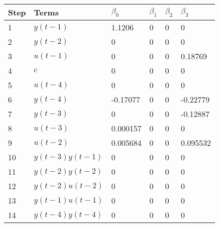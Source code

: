 \begin{tabular}{llllll}
Step & Terms & $\beta_{0}$ & $\beta_{1}$ & $\beta_{2}$ & $\beta_{3}$ \\ 
\hline 
1 & $y(t-1)$ & 1.1206 & 0 & 0 & 0 \\ 
2 & $y(t-2)$ & 0 & 0 & 0 & 0 \\ 
3 & $u(t-1)$ & 0 & 0 & 0 & 0.18769 \\ 
4 & $c$ & 0 & 0 & 0 & 0 \\ 
5 & $u(t-4)$ & 0 & 0 & 0 & 0 \\ 
6 & $y(t-4)$ & -0.17077 & 0 & 0 & -0.22779 \\ 
7 & $y(t-3)$ & 0 & 0 & 0 & -0.12887 \\ 
8 & $u(t-3)$ & 0.000157 & 0 & 0 & 0 \\ 
9 & $u(t-2)$ & 0.005684 & 0 & 0 & 0.095532 \\ 
10 & $y(t-3)y(t-1)$ & 0 & 0 & 0 & 0 \\ 
11 & $y(t-2)y(t-2)$ & 0 & 0 & 0 & 0 \\ 
12 & $y(t-2)u(t-2)$ & 0 & 0 & 0 & 0 \\ 
13 & $y(t-1)u(t-1)$ & 0 & 0 & 0 & 0 \\ 
14 & $y(t-4)y(t-4)$ & 0 & 0 & 0 & 0 \\ 
\hline 
\end{tabular}